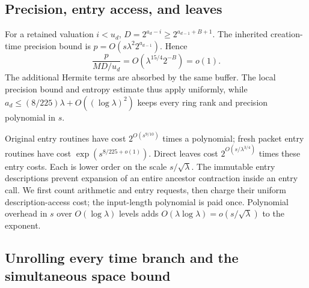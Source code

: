 \subsection{Precision, entry access, and leaves}

For a retained valuation $i<u_d$,
$D=2^{a_d-i}\ge2^{a_{d-1}+B+1}$. The inherited creation-time precision
bound is $p=O(s\lambda^2 2^{a_{d-1}})$. Hence
\[
 \frac{p}{MD/u_d}=O(\lambda^{15/4}2^{-B})=o(1).
\]
The additional Hermite terms are absorbed by the same buffer. The local
precision bound and entropy estimate thus apply uniformly, while
$a_d\le(8/225)\lambda+O((\log\lambda)^2)$ keeps every ring rank and
precision polynomial in $s$.

Original entry routines have cost $2^{O(s^{9/10})}$ times a polynomial;
fresh packet entry routines have cost $\exp(s^{8/225+o(1)})$. Direct leaves
cost $2^{O(s/\lambda^{3/4})}$ times these entry costs. Each is lower
order on the scale $s/\sqrt\lambda$. The immutable entry descriptions
prevent expansion of an entire ancestor contraction inside an entry call.
We first count arithmetic and entry requests, then charge their uniform
description-access cost; the input-length polynomial is paid once.
Polynomial overhead in $s$ over $O(\log\lambda)$ levels adds
$O(\lambda\log\lambda)=o(s/\sqrt\lambda)$ to the exponent.

\subsection{Unrolling every time branch and the simultaneous space bound}

